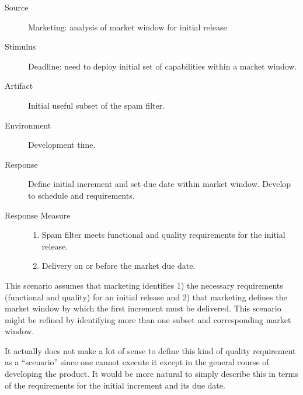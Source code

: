 \documentclass[letterpaper,11pt]{article}
\begin{document}
\begin{description}
\item[Source] Marketing: analysis of market window for initial release
\item[Stimulus] Deadline: need to deploy initial set of capabilities within a
  market window.
\item[Artifact] Initial useful subset of the spam filter.
\item[Environment] Development time.
\item[Response] Define initial increment and set due date within market
  window.  Develop to schedule and requirements.
\item[Response Measure] \hfill
  \begin{enumerate}
  \item Spam filter meets functional and quality requirements for the initial
    release.
  \item Delivery on or before the market due date.
  \end{enumerate}
\end{description}
 
This scenario assumes that marketing identifies 1) the necessary requirements
(functional and quality) for an initial release and 2) that marketing defines
the market window by which the first increment must be delivered. This
scenario might be refined by identifying more than one subset and
corresponding market window.
 
It actually does not make a lot of sense to define this kind of quality
requirement as a “scenario” since one cannot execute it except in the general
course of developing the product. It would be more natural to simply describe
this in terms of the requirements for the initial increment and its due date.
\end{document}
